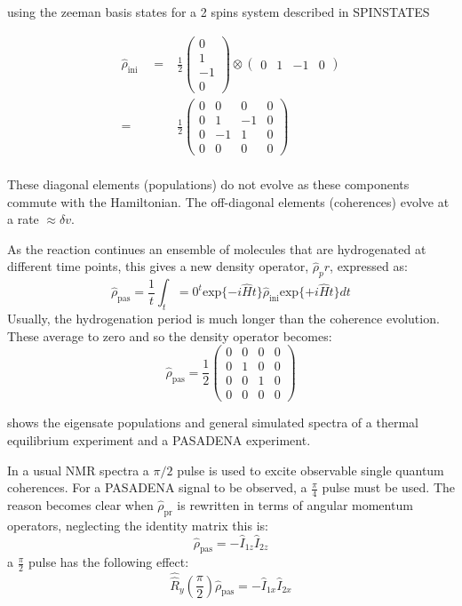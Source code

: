 using the zeeman basis states for a 2 spins system described in SPINSTATES

\begin{align}
  \hat{\rho}_{\text{ini}}\quad=& \frac{1}{2} \begin{pmatrix}
  0\\
  1\\
  -1\\
  0
  \end{pmatrix} \otimes \begin{pmatrix}
    0 & 1 & -1 & 0
    \end{pmatrix}\\
  =& \frac{1}{2}\begin{pmatrix}
  0 & 0 & 0 & 0\\
  0 & 1 & -1 & 0\\
  0 & -1 & 1 & 0\\
  0 & 0 & 0 & 0
\end{pmatrix} \\
\end{align}

These diagonal elements (populations) do not evolve as these components commute with the Hamiltonian. The off-diagonal
elements (coherences) evolve at a rate $\approx\delta{v}$.

As the reaction continues an ensemble of molecules that are hydrogenated at different time points, this gives
a new density operator, $\hat{\rho}_pr$, expressed as:
\begin{equation}
  \hat{\rho}_{\text{pas}} = \frac{1}{t} \int_t=0^t{\text{exp}\{-i\hat{H}t\}\hat{\rho}_{\text{ini}}\text{exp}\{+i\hat{H}t\}}dt
\end{equation}
Usually, the hydrogenation period is much longer than the coherence evolution. These average to zero and so the
density operator becomes:
\begin{equation}
  \hat{\rho}_{\text{pas}} = \frac{1}{2}\begin{pmatrix}
  0 & 0 & 0 & 0\\
  0 & 1 & 0 & 0\\
  0 & 0 & 1 & 0\\
  0 & 0 & 0 & 0
\end{pmatrix}
\end{equation}

 shows the eigensate populations and general simulated spectra of a thermal equilibrium experiment and
a PASADENA experiment.

In a usual NMR spectra a $\pi/2$ pulse is used to excite observable single quantum coherences. For a PASADENA signal to
be observed, a $\frac{\pi}{4}$ pulse must be used. The reason becomes clear when $\hat{\rho}_{\text{pr}}$ is rewritten
in terms of angular momentum operators, neglecting the identity matrix this is:
\begin{equation}
  \hat{\rho}_{\text{pas}} = -\hat{I}_{1z}\hat{I}_{2z}
\end{equation}
a $\frac{\pi}{2}$ pulse has the following effect:
\begin{equation}
  \hat{\hat{R}}_y(\frac{\pi}{2})\hat{\rho}_{\text{pas}} = -\hat{I}_{1x}\hat{I}_{2x}
\end{equation}

